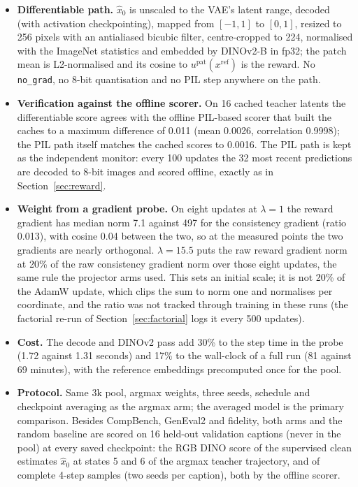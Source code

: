 \documentclass[11pt,a4paper]{article}
\begin{document}
\begin{itemize}
\item \textbf{Differentiable path.} $\hat{x}_0$ is unscaled to the VAE's latent range, decoded (with activation checkpointing), mapped from $[-1,1]$ to $[0,1]$, resized to 256 pixels with an antialiased bicubic filter, centre-cropped to 224, normalised with the ImageNet statistics and embedded by DINOv2-B in fp32; the patch mean is L2-normalised and its cosine to $u^{\mathrm{pat}}(x^{\mathrm{ref}})$ is the reward. No \texttt{no\_grad}, no 8-bit quantisation and no PIL step anywhere on the path.
\item \textbf{Verification against the offline scorer.} On 16 cached teacher latents the differentiable score agrees with the offline PIL-based scorer that built the caches to a maximum difference of 0.011 (mean 0.0026, correlation 0.9998); the PIL path itself matches the cached scores to 0.0016. The PIL path is kept as the independent monitor: every 100 updates the 32 most recent predictions are decoded to 8-bit images and scored offline, exactly as in Section~\ref{sec:reward}.
\item \textbf{Weight from a gradient probe.} On eight updates at $\lambda=1$ the reward gradient has median norm 7.1 against 497 for the consistency gradient (ratio 0.013), with cosine 0.04 between the two, so at the measured points the two gradients are nearly orthogonal. $\lambda=15.5$ puts the raw reward gradient norm at 20\% of the raw consistency gradient norm over those eight updates, the same rule the projector arms used. This sets an initial scale; it is not 20\% of the AdamW update, which clips the sum to norm one and normalises per coordinate, and the ratio was not tracked through training in these runs (the factorial re-run of Section~\ref{sec:factorial} logs it every 500 updates).
\item \textbf{Cost.} The decode and DINOv2 pass add 30\% to the step time in the probe (1.72 against 1.31 seconds) and 17\% to the wall-clock of a full run (81 against 69 minutes), with the reference embeddings precomputed once for the pool.
\item \textbf{Protocol.} Same 3k pool, argmax weights, three seeds, schedule and checkpoint averaging as the argmax arm; the averaged model is the primary comparison. Besides CompBench, GenEval2 and fidelity, both arms and the random baseline are scored on 16 held-out validation captions (never in the pool) at every saved checkpoint: the RGB DINO score of the supervised clean estimates $\hat{x}_0$ at states 5 and 6 of the argmax teacher trajectory, and of complete 4-step samples (two seeds per caption), both by the offline scorer.
\end{itemize}
\end{document}
